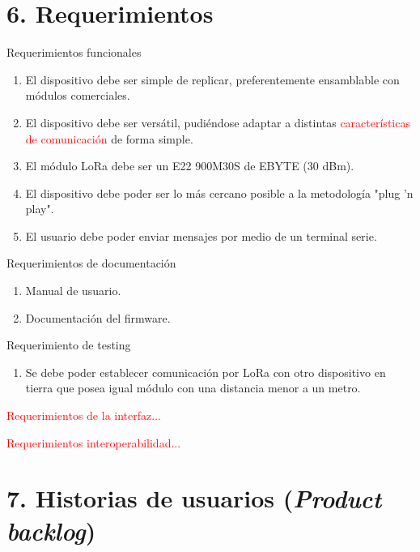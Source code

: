 \documentclass[
11pt, %
codirector, %
]{charter}
\begin{document}
\section{6. Requerimientos}
\label{sec:requerimientos}

\begin{enumerate}
	\item Requerimientos funcionales
		\begin{enumerate}
			\item El dispositivo debe ser simple de replicar, preferentemente ensamblable con módulos comerciales.
			\item El dispositivo debe ser versátil, pudiéndose adaptar a distintas \textcolor{red}{características de comunicación} de forma simple.
			\item El módulo LoRa debe ser un E22 900M30S de EBYTE (30 dBm).
			\item El dispositivo debe poder ser lo más cercano posible a la metodología "plug 'n play".
			\item El usuario debe poder enviar mensajes por medio de un terminal serie.
		\end{enumerate}
	\item Requerimientos de documentación
		\begin{enumerate}
			\item Manual de usuario.
			\item Documentación del firmware.
		\end{enumerate}
	\item Requerimiento de testing
		\begin{enumerate}
			\item Se debe poder establecer comunicación por LoRa con otro dispositivo en tierra que posea igual módulo con una distancia menor a un metro.
		\end{enumerate}
	\textcolor{red}{
	\item Requerimientos de la interfaz...
	\item Requerimientos interoperabilidad...
	}
\end{enumerate}

\section{7. Historias de usuarios (\textit{Product backlog})}
\label{sec:backlog}
\end{document}
